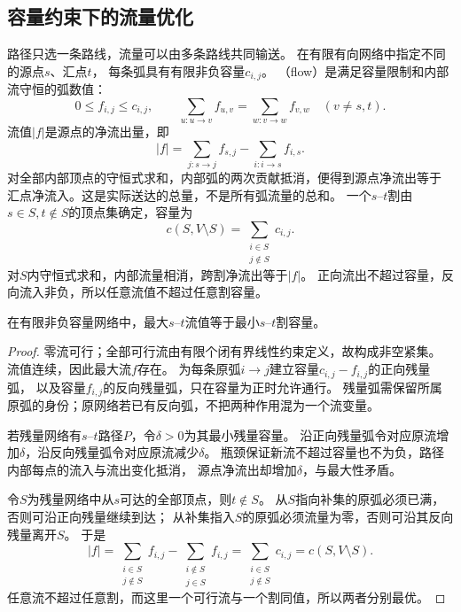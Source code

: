 \subsection{容量约束下的流量优化}

路径只选一条路线，流量可以由多条路线共同输送。
在有限有向网络中指定不同的源点\(s\)、汇点\(t\)，
每条弧具有有限非负容量\(c_{i,j}\)。
（flow）是满足容量限制和内部流守恒的弧数值：
\[
  0\leq f_{i,j}\leq c_{i,j},\qquad
  \sum_{u:u\to v}f_{u,v}
  =\sum_{w:v\to w}f_{v,w}\quad(v\neq s,t).
\]
流值\(|f|\)是源点的净流出量，即
\[
  |f|=\sum_{j:s\to j}f_{s,j}-\sum_{i:i\to s}f_{i,s}.
\]
对全部内部顶点的守恒式求和，内部弧的两次贡献抵消，便得到源点净流出等于
汇点净流入。这是实际送达的总量，不是所有弧流量的总和。
一个\(s\)--\(t\)割由\(s\in S,t\notin S\)的顶点集确定，容量为
\[
  c(S,V\setminus S)=\sum_{\substack{i\in S\\j\notin S}}c_{i,j}.
\]
对\(S\)内守恒式求和，内部流量相消，跨割净流出等于\(|f|\)。
正向流出不超过容量，反向流入非负，所以任意流值不超过任意割容量。

\begin{theorem}[最大流最小割定理]
  \label{thm:graph-theory-max-flow-min-cut}
  在有限非负容量网络中，最大\(s\)--\(t\)流值等于最小\(s\)--\(t\)割容量。
\end{theorem}

\begin{proof}
零流可行；全部可行流由有限个闭有界线性约束定义，故构成非空紧集。
流值连续，因此最大流\(f\)存在。
为每条原弧\(i\to j\)建立容量\(c_{i,j}-f_{i,j}\)的正向残量弧，
以及容量\(f_{i,j}\)的反向残量弧，只在容量为正时允许通行。
残量弧需保留所属原弧的身份；原网络若已有反向弧，不把两种作用混为一个流变量。

若残量网络有\(s\)--\(t\)路径\(P\)，令\(\delta>0\)为其最小残量容量。
沿正向残量弧令对应原流增加\(\delta\)，沿反向残量弧令对应原流减少\(\delta\)。
瓶颈保证新流不超过容量也不为负，路径内部每点的流入与流出变化抵消，
源点净流出却增加\(\delta\)，与最大性矛盾。

令\(S\)为残量网络中从\(s\)可达的全部顶点，则\(t\notin S\)。
从\(S\)指向补集的原弧必须已满，否则可沿正向残量继续到达；
从补集指入\(S\)的原弧必须流量为零，否则可沿其反向残量离开\(S\)。
于是
\[
  |f|=\sum_{\substack{i\in S\\j\notin S}}f_{i,j}
        -\sum_{\substack{i\notin S\\j\in S}}f_{i,j}
      =\sum_{\substack{i\in S\\j\notin S}}c_{i,j}
      =c(S,V\setminus S).
\]
任意流不超过任意割，而这里一个可行流与一个割同值，所以两者分别最优。
\end{proof}

